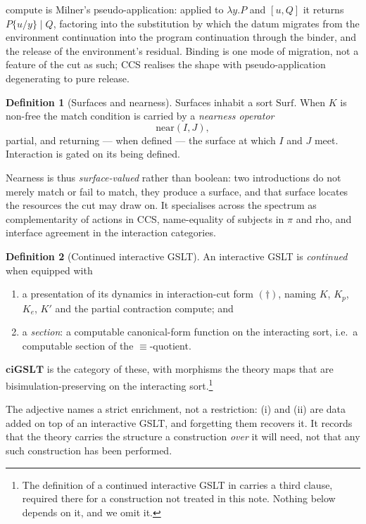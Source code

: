 \documentclass[11pt,a4paper]{article}
\theoremstyle{definition}
\newtheorem{definition}{Definition}[section]
\theoremstyle{plain}
\theoremstyle{remark}
\newcommand{\ciGSLT}{\mathbf{ciGSLT}}
\begin{document}
$\mathrm{compute}$ is Milner's pseudo-application: applied to $\lambda y.P$ and
$[u,Q]$ it returns $P\{u/y\} \mid Q$, factoring into the substitution by which the
datum migrates from the environment continuation into the program continuation
through the binder, and the release of the environment's residual. Binding is one
mode of migration, not a feature of the cut as such; CCS realises the shape with
pseudo-application degenerating to pure release.

\begin{definition}[Surfaces and nearness]
\label{def:surface}
Surfaces inhabit a sort $\mathrm{Surf}$. When $K$ is non-free the match condition is
carried by a \emph{nearness operator}
\[
\mathrm{near}(I,J),
\]
partial, and returning --- when defined --- the surface at which $I$ and $J$ meet.
Interaction is gated on its being defined.
\end{definition}

Nearness is thus \emph{surface-valued} rather than boolean: two introductions do not
merely match or fail to match, they produce a surface, and that surface locates the
resources the cut may draw on. It specialises across the spectrum as complementarity
of actions in CCS, name-equality of subjects in $\pi$ and rho, and interface
agreement in the interaction categories.

\begin{definition}[Continued interactive GSLT]
\label{def:cigslt}
An interactive GSLT is \emph{continued} when equipped with
\begin{enumerate}[label=(\roman*),leftmargin=2.4em]
\item a presentation of its dynamics in interaction-cut form $(\dagger)$, naming
$K$, $K_p$, $K_e$, $K'$ and the partial contraction $\mathrm{compute}$; and
\item a \emph{section}: a computable canonical-form function on the interacting sort,
i.e.\ a computable section of the $\equiv$-quotient.
\end{enumerate}
$\ciGSLT$ is the category of these, with morphisms the theory maps that are
bisimulation-preserving on the interacting sort.\footnote{The definition of a
continued interactive GSLT in \cite[Def.~6.1]{cost} carries a third clause, required
there for a construction not treated in this note. Nothing below depends on it, and
we omit it.}
\end{definition}

The adjective names a strict enrichment, not a restriction: (i) and (ii) are data
added on top of an interactive GSLT, and forgetting them recovers it. It records that
the theory carries the structure a construction \emph{over} it will need, not that
any such construction has been performed.
\end{document}
